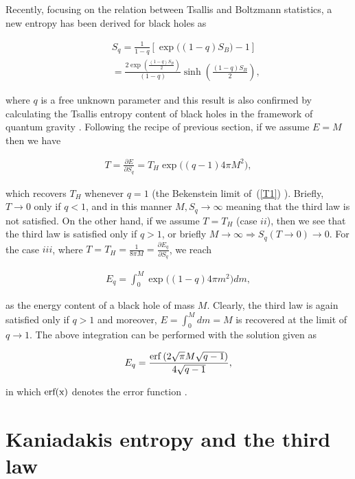 \documentclass[twocolumn,preprintnumbers,amsmath,nofootinbib,amssymb]{revtex4}
\begin{document}
Recently, focusing on the relation between Tsallis and Boltzmann
statistics, a new entropy has been derived for black holes as
\cite{KHDE}

\begin{eqnarray}\label{T1}
&&S_q=\frac{1}{1-q}[\exp\big((1-q)S_{B}\big)-1]\nonumber\\
&&=\frac{2\exp(\frac{(1-q) S_{B}}{2})}{(1-q)}\sinh\left(\frac{(1-q)
S_{B}}{2}\right),
\end{eqnarray}

\noindent where $q$ is a free unknown parameter and this result is
also confirmed by calculating the Tsallis entropy content of black
holes in the framework of quantum gravity \cite{mesri,KHDE}.
Following the recipe of previous section, if we assume $E=M$ then
we have

\begin{eqnarray}\label{T2}
T=\frac{\partial E}{\partial S_q}=T_H\exp\big((q-1)4\pi M^2\big),
\end{eqnarray}

\noindent which recovers $T_H$ whenever $q=1$ (the Bekenstein
limit of~(\ref{T1}) \cite{KHDE}). Briefly, $T\rightarrow0$ only if
$q<1$, and in this manner $M, S_q\rightarrow\infty$ meaning that
the third law is not satisfied. On the other hand, if we assume
$T=T_H$ (case $ii$), then we see that the third law is satisfied
only if $q>1$, or briefly $M\rightarrow\infty\Rightarrow
S_q(T\rightarrow0)\rightarrow0$. For the case $iii$, where
$T=T_H=\frac{1}{8\pi M}=\frac{\partial E_q}{\partial S_q}$, we
reach

\begin{eqnarray}\label{T3}
E_q=\int_0^M\exp\big((1-q)4\pi m^2\big)dm,
\end{eqnarray}

\noindent as the energy content of a black hole of mass $M$.
Clearly, the third law is again satisfied only if $q>1$ and
moreover, $E=\int_0^Mdm=M$ is recovered at the limit of
$q\rightarrow1$. The above integration can be performed with the
solution given as

\begin{eqnarray}\label{T4}
E_q=\frac{{\rm
erf}\left(2\sqrt{\pi}M\sqrt{q-1}\right)}{4\sqrt{q-1}},
\end{eqnarray}

\noindent in which $\rm erf(x)$ denotes the error function
\cite{er}.


\section{Kaniadakis entropy and the third law}
\end{document}
